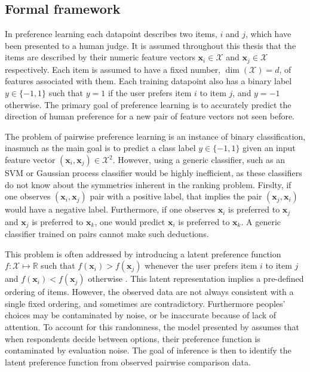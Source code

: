 \subsection{Formal framework\label{sec:prefKernel}}

In preference learning each datapoint describes two items, $i$ and $j$, which have been presented to a human judge. It is assumed throughout this thesis that the items are described by their numeric feature vectors $\mathbf{x}_i\in\mathcal{X}$ and $\mathbf{x}_j\in\mathcal{X}$ respectively. Each item is assumed to have a fixed number, $\dim(\mathcal{X})=d$, of features associated with them. Each training datapoint also has a binary label $y\in\{-1,1\}$ such that $y=1$ if the user prefers item $i$ to item $j$, and $y=-1$ otherwise. The primary goal of preference learning is to accurately predict the direction of human preference for a new pair of feature vectors not seen before.

The problem of pairwise preference learning is an instance of binary classification, inasmuch as the main goal is to predict a class label $y\in\{-1,1\}$ given an input feature vector $(\mathbf{x}_i,\mathbf{x}_j)\in\mathcal{X}^2$. However, using a generic classifier, such as an SVM or Gaussian process classifier would be highly inefficient, as these classifiers do not know about the symmetries inherent in the ranking problem. Firslty, if one observes $(\mathbf{x}_i,\mathbf{x}_j)$ pair with a positive label, that implies the pair $(\mathbf{x}_j,\mathbf{x}_i)$ would have a negative label. Furthermore, if one observes $\mathbf{x}_i$ is preferred to $\mathbf{x}_j$ and $\mathbf{x}_j$ is preferred to $\mathbf{x}_k$, one would predict $\mathbf{x}_i$ is preferred to $\mathbf{x}_k$. A generic classifier trained on pairs cannot make such deductions.

This problem is often addressed by introducing a latent preference function $f:\mathcal{X}\mapsto \mathbb{R}$ such that
$f(\mathbf{x}_i) > f(\mathbf{x}_j)$ whenever the user prefers item $i$ to item $j$ and $f(\mathbf{x}_i) < f(\mathbf{x}_j)$ otherwise \citep{chu2005}. This latent representation implies a pre-defined ordering of items. However, the observed data are not always consistent with a single fixed ordering, and sometimes are contradictory. Furthermore peoples' choices may be contaminated by noise, or be inaccurate because of lack of attention. To account for this randomness, the model presented by \citep{chu2005} assumes that when respondents decide between options, their preference function is contaminated by evaluation noise. The goal of inference is then to identify the latent preference function from observed pairwise comparison data.

